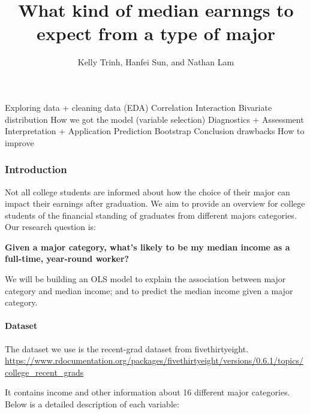 \documentclass[
]{article}
\title{What kind of median earnngs to expect from a type of major}
\author{Kelly Trinh, Hanfei Sun, and Nathan Lam}
\date{}
\begin{document}
\maketitle

Exploring data + cleaning data (EDA) Correlation Interaction Bivariate
distribution How we got the model (variable selection) Diagnostics +
Assessment Interpretation + Application Prediction Bootstrap Conclusion
drawbacks How to improve

\hypertarget{introduction}{%
\subsubsection{Introduction}\label{introduction}}

Not all college students are informed about how the choice of their
major can impact their earnings after graduation. We aim to provide an
overview for college students of the financial standing of graduates
from different majors categories. Our research question is:

\textbf{Given a major category, what's likely to be my median income as
a full-time, year-round worker?}

We will be building an OLS model to explain the association between
major category and median income; and to predict the median income given
a major category.

\hypertarget{dataset}{%
\paragraph{Dataset}\label{dataset}}

The dataset we use is the recent-grad dataset from fivethirtyeight.
\url{https://www.rdocumentation.org/packages/fivethirtyeight/versions/0.6.1/topics/college_recent_grads}

It contains income and other information about 16 different major
categories. Below is a detailed description of each variable:
\end{document}
